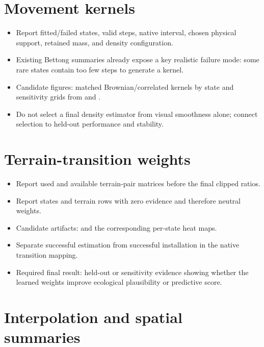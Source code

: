 \section{Movement kernels}

\begin{itemize}
  \item Report fitted/failed states, valid steps, native interval, chosen physical support, retained mass, and density configuration.
  \item Existing Bettong summaries already expose a key realistic failure mode: some rare states contain too few steps to generate a kernel.
  \item Candidate figures: matched Brownian/correlated kernels by state and sensitivity grids from  and .
  \item Do not select a final density estimator from visual smoothness alone; connect selection to held-out performance and stability.
\end{itemize}

\section{Terrain-transition weights}

\begin{itemize}
  \item Report used and available terrain-pair matrices before the final clipped ratios.
  \item Report states and terrain rows with zero evidence and therefore neutral weights.
  \item Candidate artifacts:  and the corresponding per-state heat maps.
  \item Separate successful estimation from successful installation in the native transition mapping.
  \item Required final result: held-out or sensitivity evidence showing whether the learned weights improve ecological plausibility or predictive score.
\end{itemize}

\section{Interpolation and spatial summaries}

